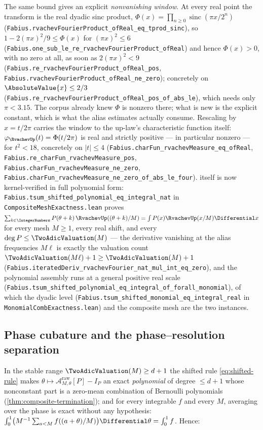 \documentclass[11pt,oneside]{article}
\numberwithin{equation}{section}
\theoremstyle{definition}
\theoremstyle{remark}
\begin{document}
The same bound gives an explicit \emph{nonvanishing window}.  At every real point the
transform is the real dyadic sinc product,
\(\Phi(x)=\prod_{n\ge0}\operatorname{sinc}(\pi x/2^n)\)
(\nolinkurl{Fabius.rvachevFourierProduct_ofReal_eq_tprod_sinc}), so
\(1-2(\pi x)^2/9\le\Phi(x)\) for \((\pi x)^2\le6\)
(\nolinkurl{Fabius.one_sub_le_re_rvachevFourierProduct_ofReal}) and hence \(\Phi(x)>0\),
with no zero at all, as soon as \(2(\pi x)^2<9\)
(\nolinkurl{Fabius.re_rvachevFourierProduct_ofReal_pos},
\nolinkurl{Fabius.rvachevFourierProduct_ofReal_ne_zero}); concretely on \(\AbsoluteValue{x}\le2/3\)
(\nolinkurl{Fabius.re_rvachevFourierProduct_ofReal_pos_of_abs_le}), which needs only
\(\pi<3.15\).  The corpus already knew \(\Phi\) is nonzero there; what is new is the
explicit constant, which is what the alias estimates actually consume.
Rescaling by \(x=t/2\pi\) carries the window to the up-law's characteristic function
itself: \(\varphi_{\RvachevUp}(t)=\Phi(t/2\pi)\) is real and strictly positive --- in particular nonzero ---
for \(t^2<18\), concretely on \(\lvert t\rvert\le4\)
(\nolinkurl{Fabius.charFun_rvachevMeasure_eq_ofReal},
\nolinkurl{Fabius.re_charFun_rvachevMeasure_pos},
\nolinkurl{Fabius.charFun_rvachevMeasure_ne_zero},
\nolinkurl{Fabius.charFun_rvachevMeasure_ne_zero_of_abs_le_four}).
 itself is now kernel-verified in full polynomial form:
\nolinkurl{Fabius.tsum_shifted_polynomial_eq_integral_nat} in
\nolinkurl{CompositeMeshExactness.lean} proves
\(\sum_{k\in\IntegerNumbers}P(\theta+k)\,\RvachevUp((\theta+k)/M)=\int P(x)\RvachevUp(x/M)\Differential x\) for every mesh
\(M\ge1\), every real shift, and every \(\deg P\le\TwoAdicValuation(M)\) --- the derivative
vanishing at the alias frequencies \(M\ell\) is exactly the valuation count
\(\TwoAdicValuation(M\ell)+1\ge\TwoAdicValuation(M)+1\) (\nolinkurl{Fabius.iteratedDeriv_rvachevFourier_nat_mul_int_eq_zero}),
and the polynomial assembly runs at a general positive real scale
(\nolinkurl{Fabius.tsum_shifted_polynomial_eq_integral_of_forall_monomial}), of which the
dyadic level (\nolinkurl{Fabius.tsum_shifted_monomial_eq_integral_real} in
\nolinkurl{MonomialCombExactness.lean}) and the composite mesh are the two instances.

\subsection{Phase cubature and the phase--resolution separation}

In the stable range $\TwoAdicValuation(M)\ge d+1$ the shifted rule
\eqref{eq:shifted-rule} makes
$\theta\mapsto\mathcal A^{\mathrm{raw}}_{M,\theta}[P]-I_P$ an exact
\emph{polynomial} of degree $\le d+1$ whose nonconstant part is a
zero-mean combination of Bernoulli polynomials
(\cref{thm:composite-termination}); and for every integrable $f$ and
every $M$, averaging over the phase is exact without any hypothesis:
$\int_0^1\bigl(M^{-1}\sum_{a<M}f((a+\theta)/M)\bigr)\Differential\theta
=\int_0^1f$.  Hence:
\end{document}
